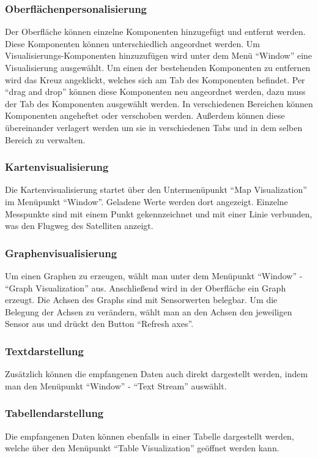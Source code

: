 \subsubsection{Oberflächenpersonalisierung}
Der Oberfläche können einzelne Komponenten hinzugefügt und entfernt werden. Diese Komponenten können unterschiedlich angeordnet werden. Um Visualisierungs-Komponenten hinzuzufügen wird unter dem Menü ``Window'' eine Visualisierung ausgewählt.
Um einen der bestehenden Komponenten zu entfernen wird das Kreuz angeklickt, welches sich am Tab des Komponenten befindet. Per ``drag and drop''  können diese Komponenten neu angeordnet werden, dazu muss der Tab des Komponenten ausgewählt werden. In verschiedenen Bereichen können Komponenten angeheftet oder verschoben werden. Außerdem können diese übereinander verlagert werden um sie in verschiedenen Tabs und in dem selben Bereich zu verwalten.

\subsubsection{Kartenvisualisierung}
Die Kartenvisualisierung startet über den Untermenüpunkt ``Map Visualization'' im Menüpunkt ``Window''. Geladene Werte werden dort angezeigt. Einzelne Messpunkte sind mit einem Punkt gekennzeichnet und mit einer Linie verbunden, was den Flugweg des Satelliten anzeigt.

\subsubsection{Graphenvisualisierung}
Um einen Graphen zu erzeugen, wählt man unter dem Menüpunkt ``Window'' - ``Graph Visualization'' aus. Anschließend wird in der Oberfläche ein Graph erzeugt. Die Achsen des Graphs sind mit Sensorwerten belegbar. Um die Belegung der Achsen zu verändern, wählt man an den Achsen den jeweiligen Sensor aus und drückt den Button ``Refresh axes''.

\subsubsection{Textdarstellung}
Zusätzlich können die empfangenen Daten auch direkt dargestellt werden, indem man den Menüpunkt ``Window'' - ``Text Stream'' auswählt.

\subsubsection {Tabellendarstellung}
Die empfangenen Daten können ebenfalls in einer Tabelle dargestellt werden, welche über den Menüpunkt ``Table Visualization'' geöffnet werden kann.

